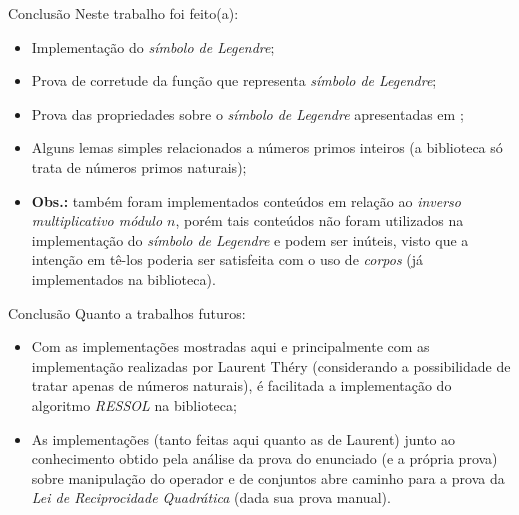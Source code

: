 \begin{frame}{Conclusão}
    Neste trabalho foi feito(a):
    \begin{itemize}
        \item Implementação do \textit{símbolo de Legendre};
        \item Prova de corretude da função que representa \textit{símbolo de Legendre};
        \item Prova das propriedades sobre o \textit{símbolo de Legendre} apresentadas em \cite{book:2399854};
        \item Alguns lemas simples relacionados a números primos inteiros (a biblioteca só trata de números primos naturais);
        
        \item[] \textbf{Obs.:} também foram implementados conteúdos em relação ao \textit{inverso multiplicativo módulo $n$}, porém tais conteúdos não foram utilizados na implementação do \textit{símbolo de Legendre} e podem ser inúteis, visto que a intenção em tê-los poderia ser satisfeita com o uso de \textit{corpos} (já implementados na biblioteca).
    \end{itemize}
\end{frame}

\begin{frame}{Conclusão}
    Quanto a trabalhos futuros:
    \begin{itemize}
        \item Com as implementações mostradas aqui e principalmente com as implementação realizadas por Laurent Théry (considerando a possibilidade de tratar apenas de números naturais), é facilitada a implementação do algoritmo \textit{RESSOL} na biblioteca;
        \item As implementações (tanto feitas aqui quanto as de Laurent) junto ao conhecimento obtido pela análise da prova do enunciado  (e a própria prova) sobre manipulação do operador  e de conjuntos abre caminho para a prova da \textit{Lei de Reciprocidade Quadrática} (dada sua prova manual).
    \end{itemize}
\end{frame}
